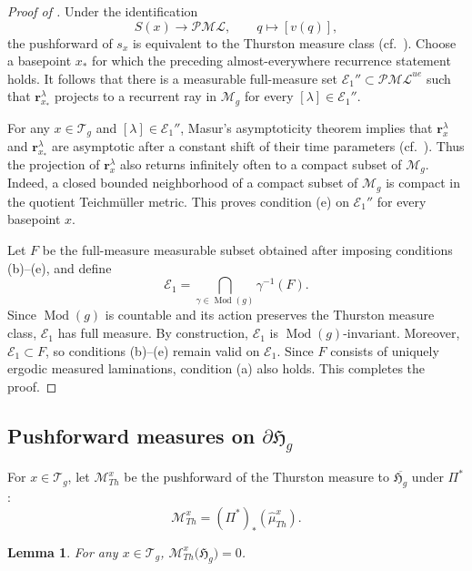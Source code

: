 \documentclass[dvipdfmx]{amsart}
\newtheorem{lemma}{Lemma}[section]
\theoremstyle{remark}
\newcommand{\teich}{\mathcal{T}}
\newcommand{\tmod}{\operatorname{Mod}}
\newcommand{\PThursM}{\hat{\mu}_{Th}}
\newcommand{\PSiegelThursM}{\mathscr{M}_{Th}}
\newcommand{\ray}{{\boldsymbol r}}
\newcommand{\pml}{\mathcal{PML}}
\begin{document}
\begin{proof}[Proof of ]
Under the identification
\[
S(x)\longrightarrow\pml,
\qquad q\longmapsto[v(q)],
\]
the pushforward of $s_x$ is equivalent to the
Thurston measure class
(cf.\ \cite[\S2.3, Proposition 2.3(i), and \S2.3.1]
{Mirzakhani_etal2012}).
Choose a basepoint $x_*$ for which the preceding
almost-everywhere recurrence statement holds.
It follows that there is a measurable full-measure
set $\mathcal E_1''\subset\pml^{ue}$ such that
$\ray^\lambda_{x_*}$ projects to a recurrent ray
in $\mathcal M_g$ for every
$[\lambda]\in\mathcal E_1''$.

For any $x\in\teich_g$ and
$[\lambda]\in\mathcal E_1''$, Masur's
asymptoticity theorem implies that
$\ray^\lambda_x$ and $\ray^\lambda_{x_*}$
are asymptotic after a constant shift of their
time parameters (cf.\ \cite{Masur1982}).
Thus the projection of $\ray^\lambda_x$ also
returns infinitely often to a compact subset
of $\mathcal M_g$.
Indeed, a closed bounded neighborhood of a compact
subset of $\mathcal M_g$ is compact in the
quotient Teichm\"uller metric.
This proves condition (e) on $\mathcal E_1''$
for every basepoint $x$.

Let $F$ be the full-measure measurable subset obtained
after imposing conditions (b)--(e), and define
\[
\mathcal E_1
=
\bigcap_{\gamma\in\tmod(g)}\gamma^{-1}(F).
\]
Since $\tmod(g)$ is countable and its action preserves
the Thurston measure class, $\mathcal E_1$ has full measure.
By construction, $\mathcal E_1$ is $\tmod(g)$-invariant.
Moreover, $\mathcal E_1\subset F$, so conditions (b)--(e)
remain valid on $\mathcal E_1$.
Since $F$ consists of uniquely ergodic measured laminations,
condition (a) also holds.
This completes the proof.
\end{proof}



\subsection{Pushforward measures on $\partial \mathfrak{H}_g$}
For $x\in\teich_g$, let $\PSiegelThursM^x$ be the pushforward of the Thurston measure to $\overline{\mathfrak{H}_g}$ under $\Pi^*$:
\[
\PSiegelThursM^x=(\Pi^*)_*(\PThursM^x).
\]

\begin{lemma}
\label{lem:null_siegel}
For any $x\in \teich_{g}$,
$\PSiegelThursM^x\bigl(\mathfrak{H}_g\bigr)=0$.
\end{lemma}
\end{document}
